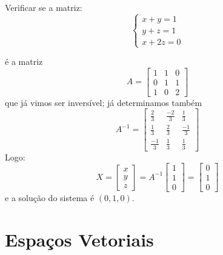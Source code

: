 \begin{ex}
	Verificar se a matriz:\\
	\begin{equation*}
\begin{cases}
x+y=1\\
y+z=1\\
x+2z=0
\end{cases}
	\end{equation*}
\end{ex}
é a matriz 
\begin{equation*}
A=\begin{bmatrix}
1 & 1 & 0\\
0 & 1 & 1\\
1 & 0 & 2 
\end{bmatrix}
\end{equation*}
que já vimos ser inversível; já determinamos também 
\begin{equation*}
A^{-1}=\begin{bmatrix}
\frac{2}{3} & \frac{-2}{3} & \frac{1}{3}\\
\frac{1}{3} & \frac{2}{3} & \frac{-1}{3}\\
\frac{-1}{3} & \frac{1}{3} & \frac{1}{3} 
\end{bmatrix}
\end{equation*}
Logo:
\begin{equation*}
X=\begin{bmatrix}
x\\
y\\
z 
\end{bmatrix}=A^{-1}\begin{bmatrix}
1\\
1\\
0 
\end{bmatrix}=\begin{bmatrix}
0\\
1\\
0 
\end{bmatrix}
\end{equation*}
e a solução do sistema é $(0,1,0)$.

\newpage 
\section{Espaços Vetoriais }

